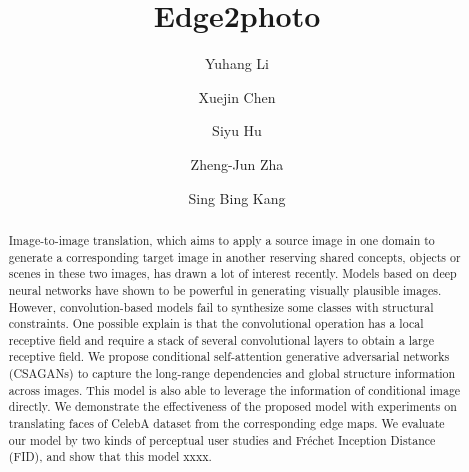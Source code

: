 \documentclass[format=acmsmall, review=false, screen=true]{acmart}
\begin{document}
\title[Edge2photo]{Edge2photo}

\author{Yuhang Li}
%
%
\author{Xuejin Chen}
%
%
\author{Siyu Hu}
%
%
\author{Zheng-Jun Zha}
%
%
\author{Sing Bing Kang}

\begin{abstract}
Image-to-image translation, which aims to apply a source image in one domain to generate a corresponding target image in another reserving shared concepts, objects or scenes in these two images, has drawn a lot of interest recently. Models based on deep neural networks have shown to be powerful in generating visually plausible images. However, convolution-based models fail to synthesize some classes with structural constraints. One possible explain is that the convolutional operation has a local receptive field and require a stack of several convolutional layers to obtain a large receptive field. We propose conditional self-attention generative adversarial networks (CSAGANs) to capture the long-range dependencies and global structure information across images. This model is also able to leverage the information of conditional image directly. We demonstrate the effectiveness of the proposed model with experiments on translating faces of CelebA dataset from the corresponding edge maps. We evaluate our model by two kinds of perceptual user studies and Fr\'echet Inception Distance (FID), and show that this model xxxx.
\end{abstract}
\end{document}
